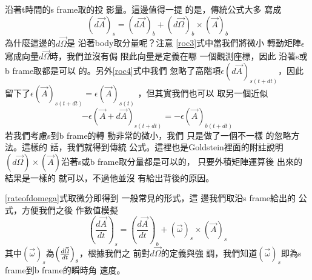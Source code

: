 \documentclass[12pt,twoside]{article}
\begin{document}
沿著t時間的s frame取的投%
影量。這邊值得一提%
的是，傳統公式大多%
寫成%
\begin{equation*}
\left( d\vec{A}\right) _{s}=\left( d\vec{A}\right) _{b}+\left( d\vec{\Omega}%
\right) _{b}\times \left( \vec{A}\right) _{b}
\end{equation*}%
為什麼這邊的$d\vec{\Omega}$是%
沿著body取分量呢？注意%
\ref{roc3}式中當我們將微小%
轉動矩陣$\epsilon $寫成向量$d%
\vec{\Omega}$時，我們並沒有侷%
限此向量是定義在哪%
一個觀測座標，因此%
沿著s或b frame取都是可以%
的。另外\ref{roc4}式中我們%
忽略了高階項$\epsilon \left( d\vec{A}%
\right) _{s(t+dt)}$，因此留下了$\epsilon
\left( \vec{A}\right) _{s(t+dt)}=\epsilon \left( \vec{A}\right) _{s(t)}$%
，但其實我們也可以%
取另一個近似%
\begin{equation*}
-\epsilon \left( \vec{A}+d\vec{A}\right) _{s(t+dt)}=-\epsilon \left( \vec{A}%
\right) _{b(t+dt)}
\end{equation*}%
若我們考慮s到b frame的轉%
動非常的微小，我們%
只是做了一個不一樣%
的忽略方法。這樣的%
話，我們就得到傳統%
公式。這裡也是Goldstein\cite%
{goldstein}裡面的附註說明$\left( d%
\vec{\Omega}\right) \times \left( \vec{A}\right) $沿著s或b
frame取分量都是可以的，%
只要外積矩陣運算後%
出來的結果是一樣的%
就可以，不過他並沒%
有給出背後的原因。

\ref{rateofdomega}式取微分即得到%
一般常見的形式，這%
邊我們取沿s frame給出的%
公式，方便我們之後%
作數值模擬%
\begin{equation}
\left( \frac{d\vec{A}}{dt}\right) _{s}=\left( \frac{d\vec{A}}{dt}\right)
_{b}+\left( \vec{\omega}\right) _{s}\times \left( \vec{A}\right) _{s}
\label{rateofchange}
\end{equation}%
其中$\left( \vec{\omega}\right) _{s}$為$\left( \frac{d\vec{%
\Omega}}{dt}\right) _{s}$，根據我們之%
前對$d\vec{\Omega}$的定義與強%
調，我們知道$\left( \vec{\omega}\right)
_{s}$即為s frame到b frame的瞬時角%
速度。
\end{document}
